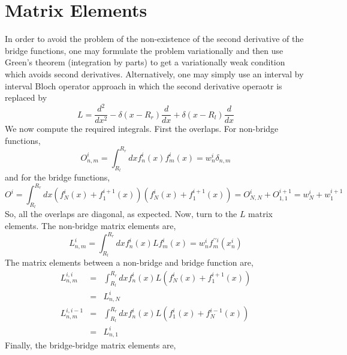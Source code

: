 \documentclass[preprint,aps]{revtex4}
\begin{document}
\section{Matrix Elements}
In order to avoid the problem of the non-existence of the second derivative of the
bridge functions, one may formulate the problem variationally and then use Green's
theorem (integration by parts) to get a variationally weak condition which avoids
second derivatives.  Alternatively, one may simply use an interval by interval
Bloch operator approach in which the second derivative operaotr is replaced by
\begin{equation}
 L = \frac{d^2}{dx^{2}} - \delta(x-R_{r}) \frac{d}{dx} + \delta(x-R_{l}) \frac{d}{dx}
\end{equation}
We now compute the required integrals.  First the overlaps.  For non-bridge functions,
\begin{equation}
    O^{i}_{n,m} = \int_{R_{l}}^{R_{r}} dx f^{i}_{n}(x) f^{i}_{m}(x)
                = w^{i}_{n} \delta_{n,m}
\end{equation}
and for the bridge functions, 
\begin{equation}
        O^{i} = \int_{R_{l}}^{R_{r}} dx ( f^{i}_{N}(x) + f^{i+1}_{1}(x) )
                                        ( f^{i}_{N}(x) + f^{i+1}_{1}(x) )
              = O^{i}_{N,N} + O^{i+1}_{1,1}
              = w^{i}_{N} + w^{i+1}_{1}
\end{equation}
So, all the overlaps are diagonal, as expected.
Now, turn to the $L$ matrix elements. The non-bridge matrix elements are,
\begin{equation}
    L^{i}_{n,m} = \int_{R_{l}}^{R_{r}} dx f^{i}_{n}(x)L f^{i}_{m}(x)
                = w^{i}_{n} f^{ \prime \prime i }_{m}(x^{i}_{n})
\end{equation}
The matrix elements between a non-bridge and bridge function are,
\begin{eqnarray}
    L^{i,i}_{n,m} &=& \int_{R_{l}}^{R_{r}} dx f^{i}_{n}(x) L 
                      ( f^{i}_{N}(x) + f^{i+1}_{1}(x) ) \\ \nonumber
                &=& L^{i}_{n,N} \\ \nonumber
    L^{i,i-1}_{n,m} &=& \int_{R_{l}}^{R_{r}} dx f^{i}_{n}(x) L 
                      ( f^{i}_{1}(x) + f^{i-1}_{N}(x) ) \\ \nonumber
                &=& L^{i}_{n,1} 
\end{eqnarray}
Finally, the bridge-bridge matrix elements are,
\end{document}
